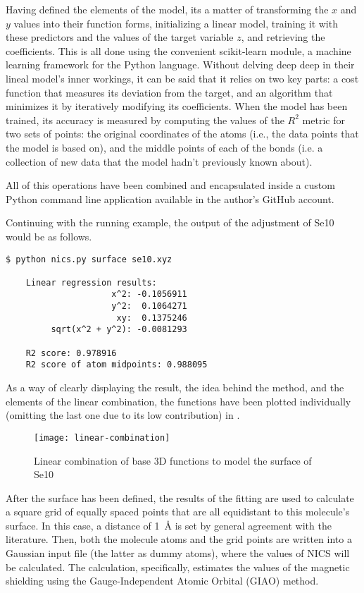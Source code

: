 Having defined the elements of the model, its a matter of transforming the $x$ and $y$ values into their function forms, initializing a linear model, training it with these predictors and the values of the target variable $z$, and retrieving the coefficients.
This is all done using the convenient scikit-learn module, a machine learning framework for the Python language.
Without delving deep deep in their lineal model's inner workings, it can be said that it relies on two key parts: a cost function that measures its deviation from the target, and an algorithm that minimizes it by iteratively modifying its coefficients.
When the model has been trained, its accuracy is measured by computing the values of the $R^2$ metric for two sets of points: the original coordinates of the atoms (i.e., the data points that the model is based on), and the middle points of each of the bonds (i.e. a collection of new data that the model hadn't previously known about).

All of this operations have been combined and encapsulated inside a custom Python command line application available in the author's GitHub account.

Continuing with the running example, the output of the adjustment of Se10 would be as follows.
\begin{lstlisting}[label=se10-output, style=kaolstplain]
$ python nics.py surface se10.xyz

    Linear regression results:
                     x^2: -0.1056911
                     y^2:  0.1064271
                      xy:  0.1375246
         sqrt(x^2 + y^2): -0.0081293

    R2 score: 0.978916
    R2 score of atom midpoints: 0.988095
\end{lstlisting}

As a way of clearly displaying the result, the idea behind the method, and the elements of the linear combination, the functions have been plotted individually (omitting the last one due to its low contribution) in .

\begin{figure*}
    \centering
    \texttt{[image: linear-combination]}
    \caption[Linear combination of base 3D functions]{Linear combination of base 3D functions to model the surface of Se10}
\end{figure*}

After the surface has been defined, the results of the fitting are used to calculate a square grid of equally spaced points that are all equidistant to this molecule's surface.
In this case, a distance of \SI{1}{\angstrom} is set by general agreement with the literature.
Then, both the molecule atoms and the grid points are written into a Gaussian input file (the latter as dummy atoms), where the values of NICS will be calculated.
The calculation, specifically, estimates the values of the magnetic shielding using the Gauge-Independent Atomic Orbital (GIAO) method.

